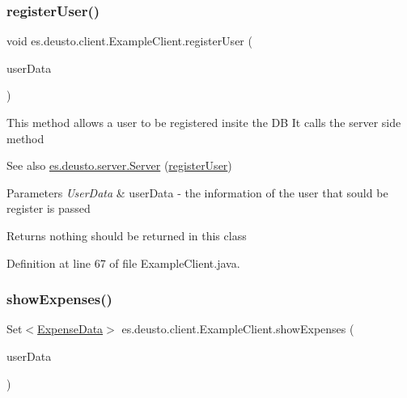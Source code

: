 \subsubsection{\texorpdfstring{register\+User()}{registerUser()}}
{\footnotesize\ttfamily void es.\+deusto.\+client.\+Example\+Client.\+register\+User (\begin{DoxyParamCaption}\item[{\hyperlink{classes_1_1deusto_1_1serialization_1_1_user_data}{User\+Data}}]{user\+Data }\end{DoxyParamCaption})}

This method allows a user to be registered insite the DB It calls the server side method \begin{DoxySeeAlso}{See also}
\hyperlink{classes_1_1deusto_1_1server_1_1_server}{es.\+deusto.\+server.\+Server} (\hyperlink{classes_1_1deusto_1_1client_1_1_example_client_a1c17371c17dde2b7664f2ad17ee79e4b}{register\+User}) 
\end{DoxySeeAlso}

\begin{DoxyParams}{Parameters}
{\em User\+Data} & user\+Data -\/ the information of the user that sould be register is passed \\
\hline
\end{DoxyParams}
\begin{DoxyReturn}{Returns}
nothing should be returned in this class 
\end{DoxyReturn}


Definition at line 67 of file Example\+Client.\+java.

\mbox{\label{classes_1_1deusto_1_1client_1_1_example_client_a527d2790290c153cae5b16133a38269a}} 
\subsubsection{\texorpdfstring{show\+Expenses()}{showExpenses()}}
{\footnotesize\ttfamily Set$<$\hyperlink{classes_1_1deusto_1_1serialization_1_1_expense_data}{Expense\+Data}$>$ es.\+deusto.\+client.\+Example\+Client.\+show\+Expenses (\begin{DoxyParamCaption}\item[{\hyperlink{classes_1_1deusto_1_1serialization_1_1_user_data}{User\+Data}}]{user\+Data }\end{DoxyParamCaption})}


